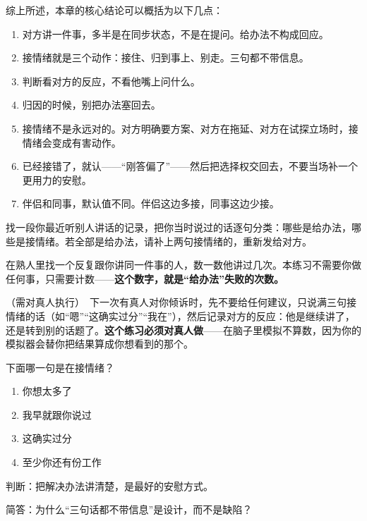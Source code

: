 
综上所述，本章的核心结论可以概括为以下几点：

\begin{enumerate}[label=\bfseries\arabic*., leftmargin=2.4em, labelsep=0.7em,
                  itemsep=0.45em, topsep=0.2em, parsep=0.2em]
\item 对方讲一件事，多半是在同步状态，不是在提问。给办法不构成回应。
\item 接情绪就是三个动作：接住、归到事上、别走。三句都不带信息。
\item 判断看对方的反应，不看他嘴上问什么。
\item 归因的时候，别把办法塞回去。
\item 接情绪不是永远对的。对方明确要方案、对方在拖延、对方在试探立场时，接情绪会变成有害动作。
\item 已经接错了，就认——“刚答偏了”——然后把选择权交回去，不要当场补一个更用力的安慰。
\item 伴侣和同事，默认值不同。伴侣这边多接，同事这边少接。
\end{enumerate}

\begin{exercisessec}
\item 找一段你最近听别人讲话的记录，把你当时说过的话逐句分类：哪些是给办法，哪些是接情绪。若全部是给办法，请补上两句接情绪的，重新发给对方。

\item 在熟人里找一个反复跟你讲同一件事的人，数一数他讲过几次。本练习不需要你做任何事，只需要计数——\textbf{这个数字，就是“给办法”失败的次数。}

\item（需对真人执行）　下一次有真人对你倾诉时，先不要给任何建议，只说满三句接情绪的话（如“嗯”“这确实过分”“我在”），然后记录对方的反应：他是继续讲了，还是转到别的话题了。\textbf{这个练习必须对真人做}——在脑子里模拟不算数，因为你的模拟器会替你把结果算成你想看到的那个。
\end{exercisessec}

\begin{quizsec}
\item 下面哪一句是在接情绪？

\begin{enumerate}[label=\Alph*., leftmargin=2.2em, labelsep=0.6em,
                  itemsep=0.2em, topsep=0.3em, parsep=0.1em]
\item 你想太多了
\item 我早就跟你说过
\item 这确实过分
\item 至少你还有份工作
\end{enumerate}

\item 判断：把解决办法讲清楚，是最好的安慰方式。

\item 简答：为什么“三句话都不带信息”是设计，而不是缺陷？
\end{quizsec}

